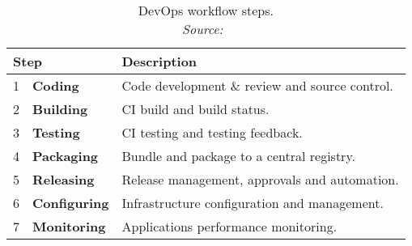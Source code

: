 \documentclass[12pt, a4paper]{article}
\begin{document}
        \begin{table}[]
            \centering
            \begin{tabularx}{0.85\textwidth}{llX}
                \multicolumn{2}{l}{Step} & Description \\ \midrule\midrule
                1 & \textbf{Coding}& Code development \& review and source control.  \\
                2 & \textbf{Building}& \acs{CI} build and build status.  \\
                3 & \textbf{Testing}& \acs{CI} testing and testing feedback.  \\
                4 & \textbf{Packaging}& Bundle and package to a central registry.  \\
                5 & \textbf{Releasing}& Release management, approvals and automation.  \\
                6 & \textbf{Configuring}& Infrastructure configuration and management.  \\
                7 & \textbf{Monitoring}& Applications performance monitoring.  \\
            \end{tabularx}
            \caption{DevOps workflow steps. \\\textit{Source:~\cite{base_devops}}}
            \label{tab::devops_steps}
        \end{table}
\end{document}
